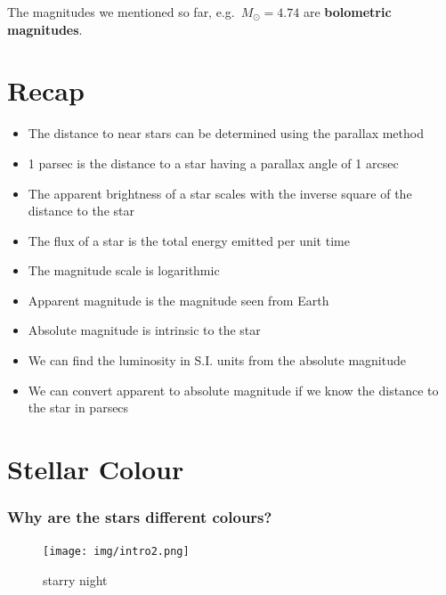 \documentclass[
  letterpaper,
  DIV=11,
  numbers=noendperiod]{scrreprt}
\begin{document}
The magnitudes we mentioned so far, e.g.~\(M_\odot = 4.74\) are
\textbf{bolometric magnitudes}.


\hypertarget{recap}{%
\chapter{Recap}\label{recap}}

\begin{itemize}
\item
  The distance to near stars can be determined using the parallax method
\item
  1 parsec is the distance to a star having a parallax angle of 1 arcsec
\item
  The apparent brightness of a star scales with the inverse square of
  the distance to the star
\item
  The flux of a star is the total energy emitted per unit time
\item
  The magnitude scale is logarithmic
\item
  Apparent magnitude is the magnitude seen from Earth
\item
  Absolute magnitude is intrinsic to the star
\item
  We can find the luminosity in S.I. units from the absolute magnitude
\item
  We can convert apparent to absolute magnitude if we know the distance
  to the star in parsecs
\end{itemize}


\hypertarget{stellar-colour}{%
\chapter{Stellar Colour}\label{stellar-colour}}

\hypertarget{why-are-the-stars-different-colours}{%
\subsection{Why are the stars different
colours?}\label{why-are-the-stars-different-colours}}

\begin{figure}

{\centering \texttt{[image: img/intro2.png]}

}

\caption{starry night}

\end{figure}
\end{document}
